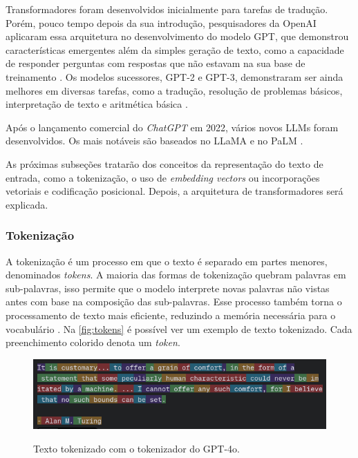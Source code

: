 Transformadores foram desenvolvidos inicialmente para tarefas de tradução. Porém, pouco tempo depois da sua introdução, pesquisadores da OpenAI aplicaram essa arquitetura
no desenvolvimento do modelo \ac{GPT}, que demonstrou características emergentes além da simples geração de texto, como a capacidade de responder perguntas com
respostas que não estavam na sua base de treinamento \cite{gpt1}. Os modelos sucessores, \ac{GPT}-2 e \ac{GPT}-3, demonstraram ser ainda melhores em diversas tarefas,
como a tradução, resolução de problemas básicos, interpretação de texto e aritmética básica \cite{gpt2, gpt3}.

Após o lançamento comercial do \textit{ChatGPT} em 2022, vários novos \acp{LLM} foram desenvolvidos. Os mais notáveis são baseados no \ac{LLaMA} e no \ac{PaLM}
\cite{llm_survey_2024}.

As próximas subseções tratarão dos conceitos da representação do texto de entrada, como a tokenização, o uso de \textit{embedding vectors} ou incorporações vetoriais e
codificação posicional. Depois, a arquitetura de transformadores será explicada.

\subsubsection{Tokenização}

A tokenização é um processo em que o texto é separado em partes menores, denominados \textit{tokens}. A maioria das formas de tokenização quebram palavras em
sub-palavras, isso permite que o modelo interprete novas palavras não vistas antes com base na composição das sub-palavras. Esse processo também torna o processamento de
texto mais eficiente, reduzindo a memória necessária para o vocabulário \cite{tokenizer_performance}. Na \autoref{fig:tokens} é possível ver um exemplo de texto
tokenizado. Cada preenchimento colorido denota um \textit{token}.

\clearpage

\begin{figure}[ht]
      \centering
      \caption{\small Texto tokenizado com o tokenizador do \ac{GPT}-4o.}
      \includegraphics[width=0.7\columnwidth,keepaspectratio]{images/tokens.png}
      \label{fig:tokens}
\end{figure}

